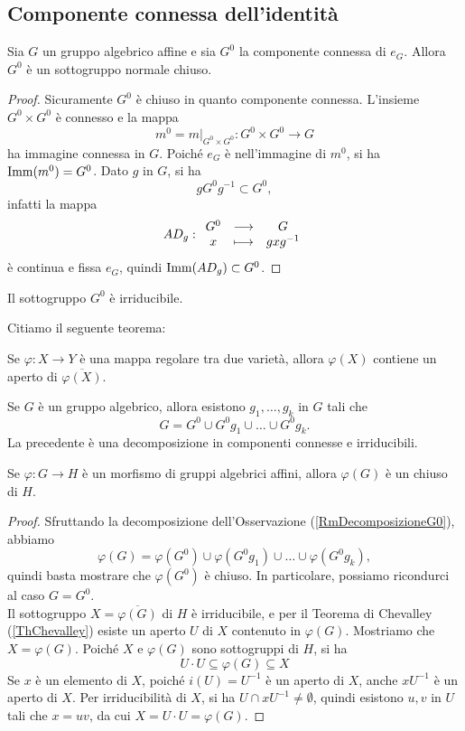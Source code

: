 \subsection{Componente connessa dell'identit\`a}
\begin{proposition}
    Sia $G$ un gruppo algebrico affine e sia $G^0$ la componente connessa di $e_G$. Allora $G^0$ è un sottogruppo normale chiuso.
\end{proposition}
\begin{proof}
    Sicuramente $G^0$ è chiuso in quanto componente connessa. L'insieme $G^0\times G^0$ è connesso e la mappa \[ m^0=\left.m\right|_{G^0\times G^0}\colon G^0\times G^0 \longrightarrow G\] ha immagine connessa in $G$. Poiché $e_G$ è nell'immagine di $m^0$, si ha $\operatorname{Imm}(m^0)=G^0$. Dato $g$ in $G$, si ha \[gG^0g^{-1}\subset G^0,\]
    infatti la mappa
    \[AD_g:\begin{array}{ccc} {G^0} & \longrightarrow & {G}\\ {x} & \longmapsto & {gxg^{-1}} \end{array}\]
    \`e continua e fissa $e_G$, quindi $\operatorname{Imm}(AD_g)\subset G^0$.
\end{proof}

\begin{exercise}
    Il sottogruppo $G^0$ è irriducibile.
\end{exercise}

Citiamo il seguente teorema:

\begin{theorem}[Chevalley]\label{ThChevalley}
    Se $\varphi\colon X \to Y$ è una mappa regolare tra due varietà, allora $\varphi(X)$ contiene un aperto di $\overline{\varphi(X)}$.
\end{theorem}

\begin{remark}\label{RmDecomposizioneG0}
    Se $G$ è un gruppo algebrico, allora esistono $g_1,\ldots,g_k$ in $G$ tali che \[G=G^0 \cup G^0 g_1 \cup \ldots\cup G^0g_k.\]
    La precedente è una decomposizione in componenti connesse e irriducibili.
\end{remark}

\begin{proposition}\label{PrMorfismoTraGruppiAlgebriciAffiniHaImmagineChiusa}
    Se $\varphi\colon G \to H$ è un morfismo di gruppi algebrici affini, allora $\varphi(G)$ è un chiuso di $H$.
\end{proposition}
\begin{proof}
    Sfruttando la decomposizione dell'Osservazione (\ref{RmDecomposizioneG0}), abbiamo
    \[\varphi(G)=\varphi(G^0) \cup \varphi(G^0 g_1) \cup \ldots\cup \varphi(G^0g_k),\]
    quindi basta mostrare che $\varphi(G^0)$ è chiuso. In particolare, possiamo ricondurci al caso $G=G^0$. \\
    Il sottogruppo $X=\overline{\varphi(G)}$ di $H$ è irriducibile, e per il Teorema di Chevalley (\ref{ThChevalley}) esiste un aperto $U$ di $X$ contenuto in $\varphi(G)$. Mostriamo che $X=\varphi(G)$. Poiché $X$ e $\varphi(G)$ sono sottogruppi di $H$, si ha \[U\cdot U \subseteq \varphi(G)\subseteq X\]
    Se $x$ è un elemento di $X$, poiché $i(U)=U^{-1}$ è un aperto di $X$, anche $xU^{-1}$ è un aperto di $X$. Per irriducibilità di $X$, si ha $U\cap xU^{-1} \ne \emptyset$, quindi esistono $u,v$ in $U$ tali che $x=uv$, da cui $X=U\cdot U =\varphi(G)$.
\end{proof}




